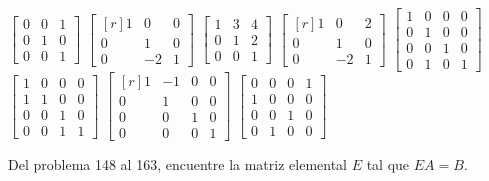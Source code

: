 \begin{tasks}[
    start=133,
    style=enumerate,
    label-offset = 4mm,
    ]
    \task $\begin{bmatrix*}0 & 0 & 1 \\ 0 & 1 & 0 \\ 0 & 0 & 1\end{bmatrix*}$
    \task $\begin{bmatrix*}[r]1 & 0 & 0 \\ 0 & 1 & 0 \\ 0 & -2 & 1\end{bmatrix*}$
    \task $\begin{bmatrix*}1 & 3 & 4 \\ 0 & 1 & 2 \\ 0 & 0 & 1\end{bmatrix*}$
    \task $\begin{bmatrix*}[r]1 & 0 & 2 \\ 0 & 1 & 0 \\ 0 & -2 & 1\end{bmatrix*}$
    \task $\begin{bmatrix*}1 & 0 & 0 & 0 \\ 0 & 1 & 0 & 0 \\ 0 & 0 & 1 & 0 \\ 0 & 1 & 0 & 1\end{bmatrix*}$
    \task $\begin{bmatrix*}1 & 0 & 0 & 0 \\ 1 & 1 & 0 & 0 \\ 0 & 0 & 1 & 0 \\ 0 & 0 & 1 & 1\end{bmatrix*}$
    \task $\begin{bmatrix*}[r]1 & -1 & 0 & 0 \\ 0 & 1 & 0 & 0 \\ 0 & 0 & 1 & 0 \\ 0 & 0 & 0 & 1\end{bmatrix*}$
    \task $\begin{bmatrix*}0 & 0 & 0 & 1 \\ 1 & 0 & 0 & 0 \\ 0 & 0 & 1 & 0 \\ 0 & 1 & 0 & 0\end{bmatrix*}$
\end{tasks}
Del problema 148 al 163, encuentre la matriz elemental $E$ tal que $E A=B$.
